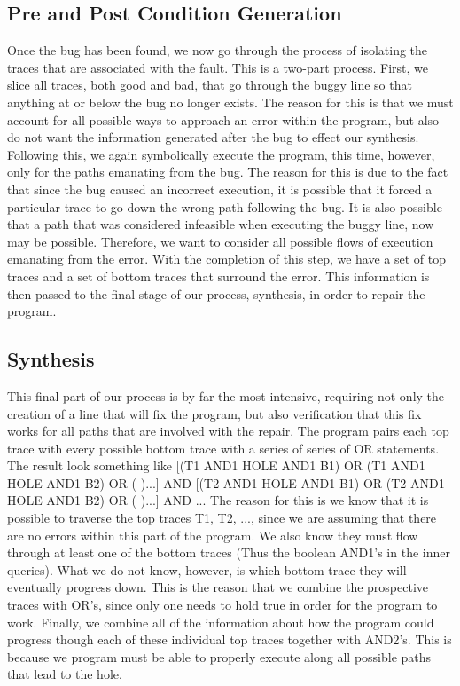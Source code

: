 \documentclass[]{article}
\begin{document}
\subsection{Pre and Post Condition Generation}
Once the bug has been found, we now go through the process of isolating the
traces that are associated with the fault.  This is a two-part process.
First, we slice all traces, both good and bad, that go through the buggy
line so that anything at or below the bug no longer exists.  The reason for
this is that we must account for all possible ways to approach an error
within the program, but also do not want the information generated after the
bug to effect our synthesis.  Following this, we again symbolically execute
the program, this time, however, only for the paths emanating from the bug.
The reason for this is due to the fact that since the bug caused an
incorrect execution, it is possible that it forced a particular trace to go
down the wrong path following the bug.  It is also possible that a path that
was considered infeasible when executing the buggy line, now may be
possible.  Therefore, we want to consider all possible flows of execution
emanating from the error.  With the completion of this step, we have a set
of top traces and a set of bottom traces that surround the error.  This
information is then passed to the final stage of our process, synthesis, in
order to repair the program.

\subsection{Synthesis}
This final part of our process is by far the most intensive, requiring not
only the creation of a line that will fix the program, but also verification
that this fix works for all paths that are involved with the repair.  The
program pairs each top trace with every possible bottom trace with a series
of series of OR statements.  The result look something like [(T1 AND1 HOLE
AND1 B1) OR (T1 AND1 HOLE AND1 B2) OR ( )...] AND  [(T2 AND1 HOLE AND1 B1)
OR (T2 AND1 HOLE AND1 B2) OR ( )...] AND ... The reason for this is we know
that it is possible to traverse the top traces T1, T2, ..., since we are
assuming that there are no errors within this part of the program.  We also
know they must flow through at least one of the bottom traces (Thus the
boolean AND1's in the inner queries).  What we do not know, however, is
which bottom trace they will eventually progress down.  This is the reason
that we combine the prospective traces with OR's, since only one needs to
hold true in order for the program to work.  Finally, we combine all of the
information about how the program could progress though each of these
individual top traces together with AND2's.  This is because we program must
be able to properly execute along all possible paths that lead to the hole.
\end{document}
